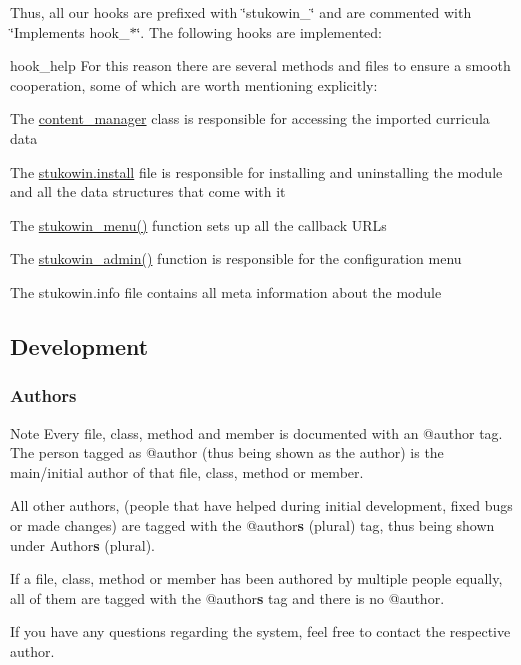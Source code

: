 Thus, all our hooks are prefixed with \char`\"{}stukowin\+\_\+\char`\"{} and are commented with \char`\"{}\+Implements hook\+\_\+$\ast$\char`\"{}. The following hooks are implemented\+:
\begin{DoxyItemize}
\item hook\+\_\+help For this reason there are several methods and files to ensure a smooth cooperation, some of which are worth mentioning explicitly\+:
\item The \hyperlink{classcontent__manager}{content\+\_\+manager} class is responsible for accessing the imported curricula data
\item The \hyperlink{stukowin_8install}{stukowin.\+install} file is responsible for installing and uninstalling the module and all the data structures that come with it
\item The \hyperlink{group___stukowin___module_ga59cfbad113b7aa2d10f0b204a5f7ba0d}{stukowin\+\_\+menu()} function sets up all the callback U\+R\+Ls
\item The \hyperlink{group___stukowin___module_ga55d453d5b6f8ae4e643308d8814e67a5}{stukowin\+\_\+admin()} function is responsible for the configuration menu
\item The stukowin.\+info file contains all meta information about the module
\end{DoxyItemize}\hypertarget{index_Development}{}\subsection{Development}\label{index_Development}
\hypertarget{index_Authors}{}\subsubsection{Authors}\label{index_Authors}
\begin{DoxyNote}{Note}
Every file, class, method and member is documented with an {\ttfamily @author} tag. The person tagged as {\ttfamily @author} (thus being shown as the author) is the main/initial author of that file, class, method or member. 

All other authors, (people that have helped during initial development, fixed bugs or made changes) are tagged with the {\ttfamily @author{\bfseries s} }(plural) tag, thus being shown under Author{\bfseries s} {\bfseries }(plural). 

If a file, class, method or member has been authored by multiple people equally, all of them are tagged with the {\ttfamily @author{\bfseries s} tag} and there is no {\ttfamily @author}. 

If you have any questions regarding the system, feel free to contact the respective author.
\end{DoxyNote}
